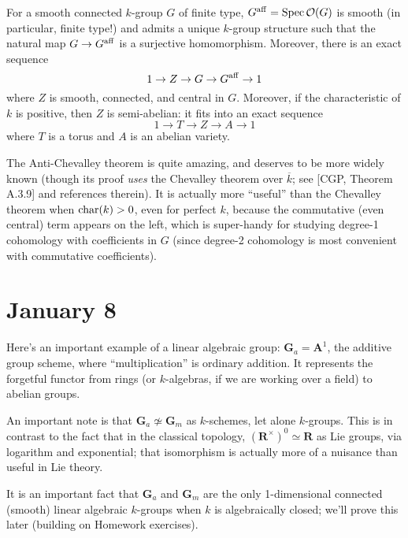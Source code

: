 \documentclass[10pt]{article}
\newcommand{\cO}{\mathcal{O}}
\renewcommand{\AA}{\mathbf{A}}
\newcommand{\RR}{\mathbf{R}}
\renewcommand{\(}{\left(}
\renewcommand{\)}{\right)}
\renewcommand{\bar}{\overline}
\newcommand{\Spec}{\operatorname{Spec}}
\numberwithin{thm}{subsection}
\begin{document}
\begin{thm}
For a smooth connected $k$-group $G$ of finite type,
$G^{\rm{aff}}=\Spec\cO(G)$ is smooth (in particular, finite type!) and admits a unique $k$-group structure such that
the natural map $G \rightarrow G^{\rm{aff}}$ is a surjective homomorphism. Moreover, there is an exact sequence
\[1\to Z\to G\to G^{\rm{aff}}\to 1\]
where $Z$ is smooth, connected, and central in $G$.
Moreover, if the characteristic of $k$ is positive,
then $Z$ is semi-abelian: it fits into an exact sequence
\[1\to T\to Z\to A\to 1\]
where $T$ is a torus and $A$ is an abelian variety.
\end{thm}
The Anti-Chevalley theorem is quite amazing, and deserves to be more widely known
(though its proof {\em uses} the Chevalley  theorem over $\bar k$; see [CGP, Theorem A.3.9]
and references therein).  It is
actually more ``useful'' than the Chevalley theorem when ${\rm{char}}(k) > 0$, even for perfect $k$, 
because the commutative (even central) term appears on the left, which is super-handy
for studying degree-1 cohomology with coefficients in $G$ (since 
degree-2 cohomology is most convenient with commutative coefficients).

\section{January 8}

Here's an important example of a linear algebraic group: $\mathbf{G}_a=\AA^1$,
the additive group scheme, where ``multiplication''
is ordinary addition. It represents the forgetful functor from rings
(or $k$-algebras, if we are working over a field) to abelian groups.

An important note is that $\mathbf{G}_a\not\simeq \mathbf{G}_m$ as $k$-schemes, let alone $k$-groups. This is in contrast to the fact that in the classical topology,
$(\RR^\times)^0\simeq \RR$ 
as Lie groups, via logarithm and exponential; that isomorphism is actually more of a nuisance than useful in
 Lie theory.

It is an important fact that $\mathbf{G}_a$ and $\mathbf{G}_m$ are the only 1-dimensional connected (smooth)
 linear algebraic $k$-groups when $k$ is algebraically closed; we'll prove this later (building on Homework exercises).
\end{document}
